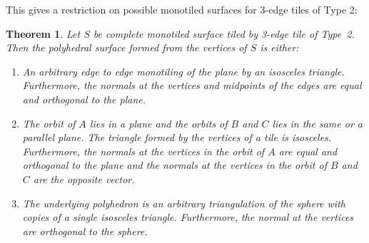 \documentclass[11pt]{amsart}
\newtheorem{theorem}{Theorem}
\theoremstyle{remark}
\begin{document}
This gives a restriction on possible monotiled surfaces for 3-edge tiles of Type 2:
\begin{theorem}  \label{thm:type2}
  Let $S$ be complete monotiled surface tiled by 3-edge tile of
  Type~2.  Then the polyhedral surface formed from the vertices of $S$ is either:
  \begin{enumerate}
  \item An arbitrary edge to edge monotiling of the plane by an isosceles triangle. 
  Furthermore, the normals at the vertices and midpoints of the edges are equal and
    orthogonal to the plane.
  \item \label{cylinder}
The orbit of $A$ lies in a plane and the orbits of $B$ and
    $C$ lies in the same or a parallel plane. The triangle formed by the vertices of 
    a tile is isosceles.  Furthermore, the
    normals at the vertices in the orbit of $A$ are equal and
    orthogonal to the plane and the normals at the vertices in the
    orbit of $B$ and $C$ are the opposite vector.
      \item The underlying polyhedron is an arbitrary triangulation of the
    sphere with copies of a single isosceles triangle. Furthermore,
    the normal at the vertices are orthogonal to the sphere.
  \end{enumerate}
  \end{theorem}
\end{document}

